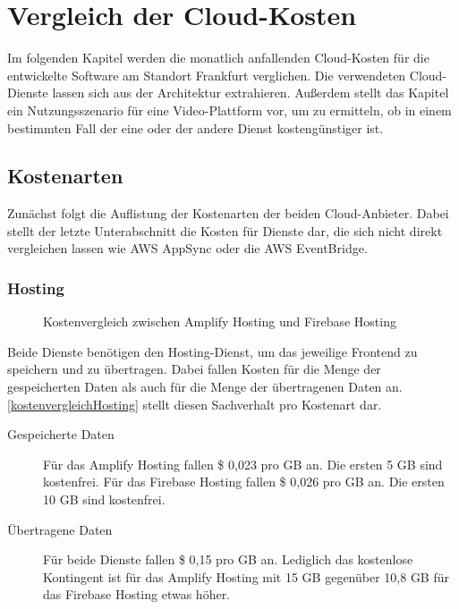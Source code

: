 \chapter{Vergleich der Cloud-Kosten}
\label{kap7}

Im folgenden Kapitel werden die monatlich anfallenden Cloud-Kosten \autocite{awsPricing} \autocite{gcpPricing} für die entwickelte Software am Standort Frankfurt verglichen. Die verwendeten Cloud-Dienste lassen sich aus der Architektur extrahieren. Außerdem stellt das Kapitel ein Nutzungsszenario für eine Video-Plattform vor, um zu ermitteln, ob in einem bestimmten Fall der eine oder der andere Dienst kostengünstiger ist.

\section{Kostenarten}

Zunächst folgt die Auflistung der Kostenarten der beiden Cloud-Anbieter. Dabei stellt der letzte Unterabschnitt die Kosten für Dienste dar, die sich nicht direkt vergleichen lassen wie \ac{AWS} AppSync oder die \ac{AWS} EventBridge.

\subsection{Hosting}

\begin{figure}%
    \centering
    \qquad
    \caption{Kostenvergleich zwischen Amplify Hosting und Firebase Hosting}%
    \label{kostenvergleichHosting}%
\end{figure}

Beide Dienste benötigen den Hosting-Dienst, um das jeweilige Frontend zu speichern und zu übertragen. Dabei fallen Kosten für die Menge der gespeicherten Daten als auch für die Menge der übertragenen Daten an. \autoref{kostenvergleichHosting} stellt diesen Sachverhalt pro Kostenart dar.

\begin{description}
  \item[Gespeicherte Daten] Für das Amplify Hosting fallen \$ 0,023 pro GB an. Die ersten 5 GB sind kostenfrei. Für das Firebase Hosting fallen \$ 0,026 pro GB an. Die ersten 10 GB sind kostenfrei.
  \item[Übertragene Daten] Für beide Dienste fallen \$ 0,15 pro GB an. Lediglich das kostenlose Kontingent ist für das Amplify Hosting mit 15 GB gegenüber 10,8 GB für das Firebase Hosting etwas höher.
\end{description}

